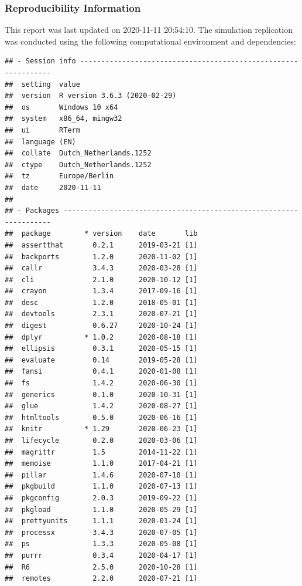 \documentclass[10,a4paperpaper,]{article}
\begin{document}
\subsubsection*{Reproducibility Information}

This report was last updated on 2020-11-11 20:54:10. The simulation
replication was conducted using the following computational environment
and dependencies:

\FloatBarrier

\begin{verbatim}
## - Session info ---------------------------------------------------------------
##  setting  value                       
##  version  R version 3.6.3 (2020-02-29)
##  os       Windows 10 x64              
##  system   x86_64, mingw32             
##  ui       RTerm                       
##  language (EN)                        
##  collate  Dutch_Netherlands.1252      
##  ctype    Dutch_Netherlands.1252      
##  tz       Europe/Berlin               
##  date     2020-11-11                  
## 
## - Packages -------------------------------------------------------------------
##  package        * version    date       lib
##  assertthat       0.2.1      2019-03-21 [1]
##  backports        1.2.0      2020-11-02 [1]
##  callr            3.4.3      2020-03-28 [1]
##  cli              2.1.0      2020-10-12 [1]
##  crayon           1.3.4      2017-09-16 [1]
##  desc             1.2.0      2018-05-01 [1]
##  devtools         2.3.1      2020-07-21 [1]
##  digest           0.6.27     2020-10-24 [1]
##  dplyr          * 1.0.2      2020-08-18 [1]
##  ellipsis         0.3.1      2020-05-15 [1]
##  evaluate         0.14       2019-05-28 [1]
##  fansi            0.4.1      2020-01-08 [1]
##  fs               1.4.2      2020-06-30 [1]
##  generics         0.1.0      2020-10-31 [1]
##  glue             1.4.2      2020-08-27 [1]
##  htmltools        0.5.0      2020-06-16 [1]
##  knitr          * 1.29       2020-06-23 [1]
##  lifecycle        0.2.0      2020-03-06 [1]
##  magrittr         1.5        2014-11-22 [1]
##  memoise          1.1.0      2017-04-21 [1]
##  pillar           1.4.6      2020-07-10 [1]
##  pkgbuild         1.1.0      2020-07-13 [1]
##  pkgconfig        2.0.3      2019-09-22 [1]
##  pkgload          1.1.0      2020-05-29 [1]
##  prettyunits      1.1.1      2020-01-24 [1]
##  processx         3.4.3      2020-07-05 [1]
##  ps               1.3.3      2020-05-08 [1]
##  purrr            0.3.4      2020-04-17 [1]
##  R6               2.5.0      2020-10-28 [1]
##  remotes          2.2.0      2020-07-21 [1]

\end{verbatim}
\end{document}
